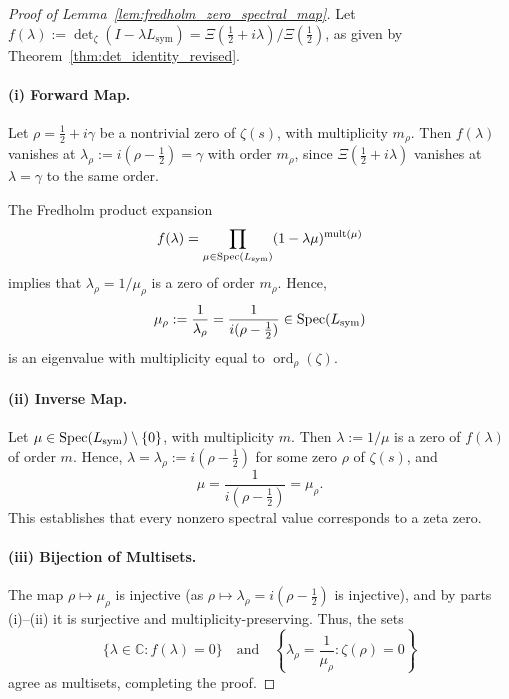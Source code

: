 \begin{proof}[Proof of Lemma~\ref{lem:fredholm_zero_spectral_map}]
Let \( f(\lambda) := \det\nolimits_\zeta(I - \lambda L_{\mathrm{sym}}) = \Xi(\tfrac{1}{2} + i\lambda)/\Xi(\tfrac{1}{2}) \), as given by Theorem~\ref{thm:det_identity_revised}.

\paragraph{(i) Forward Map.}
Let \( \rho = \tfrac{1}{2} + i\gamma \) be a nontrivial zero of \( \zeta(s) \), with multiplicity \( m_\rho \). Then \( f(\lambda) \) vanishes at \( \lambda_\rho := i(\rho - \tfrac{1}{2}) = \gamma \) with order \( m_\rho \), since \(\Xi(\tfrac{1}{2} + i\lambda)\) vanishes at \( \lambda = \gamma \) to the same order.

The Fredholm product expansion
\[
f(\lambda) = \prod_{\mu \in \operatorname{Spec}(L_{\mathrm{sym}})} (1 - \lambda \mu)^{\operatorname{mult}(\mu)}
\]
implies that \( \lambda_\rho = 1/\mu_\rho \) is a zero of order \( m_\rho \). Hence,
\[
\mu_\rho := \frac{1}{\lambda_\rho} = \frac{1}{i(\rho - \tfrac{1}{2})} \in \operatorname{Spec}(L_{\mathrm{sym}})
\]
is an eigenvalue with multiplicity equal to \( \operatorname{ord}_\rho(\zeta) \).

\paragraph{(ii) Inverse Map.}
Let \( \mu \in \operatorname{Spec}(L_{\mathrm{sym}}) \setminus \{0\} \), with multiplicity \( m \). Then \( \lambda := 1/\mu \) is a zero of \( f(\lambda) \) of order \( m \). Hence, \( \lambda = \lambda_\rho := i(\rho - \tfrac{1}{2}) \) for some zero \( \rho \) of \( \zeta(s) \), and
\[
\mu = \frac{1}{i(\rho - \tfrac{1}{2})} = \mu_\rho.
\]
This establishes that every nonzero spectral value corresponds to a zeta zero.

\paragraph{(iii) Bijection of Multisets.}
The map \( \rho \mapsto \mu_\rho \) is injective (as \(\rho \mapsto \lambda_\rho = i(\rho - \tfrac{1}{2})\) is injective), and by parts (i)–(ii) it is surjective and multiplicity-preserving. Thus, the sets
\[
\{ \lambda \in \mathbb{C} : f(\lambda) = 0 \}
\quad \text{and} \quad
\left\{ \lambda_\rho = \frac{1}{\mu_\rho} : \zeta(\rho) = 0 \right\}
\]
agree as multisets, completing the proof.
\end{proof}
% 